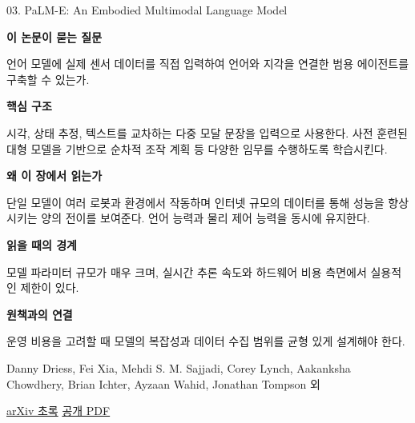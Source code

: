 \documentclass[11pt,openany]{book}
\begin{document}
\begin{termcard}{03. PaLM-E: An Embodied Multimodal Language Model}

\par

\medskip

{\sffamily\bfseries\color{deepblue} 이 논문이 묻는 질문}\par

언어 모델에 실제 센서 데이터를 직접 입력하여 언어와 지각을 연결한 범용 에이전트를 구축할 수 있는가.

\smallskip

{\sffamily\bfseries\color{deepblue} 핵심 구조}\par

시각, 상태 추정, 텍스트를 교차하는 다중 모달 문장을 입력으로 사용한다. 사전 훈련된 대형 모델을 기반으로 순차적 조작 계획 등 다양한 임무를 수행하도록 학습시킨다.

\smallskip

{\sffamily\bfseries\color{deepblue} 왜 이 장에서 읽는가}\par

단일 모델이 여러 로봇과 환경에서 작동하며 인터넷 규모의 데이터를 통해 성능을 향상시키는 양의 전이를 보여준다. 언어 능력과 물리 제어 능력을 동시에 유지한다.

\smallskip

{\sffamily\bfseries\color{coral} 읽을 때의 경계}\par

모델 파라미터 규모가 매우 크며, 실시간 추론 속도와 하드웨어 비용 측면에서 실용적인 제한이 있다.

\smallskip

{\sffamily\bfseries\color{teal} 원책과의 연결}\par

운영 비용을 고려할 때 모델의 복잡성과 데이터 수집 범위를 균형 있게 설계해야 한다.

\medskip

{\footnotesize\color{muted} Danny Driess, Fei Xia, Mehdi S. M. Sajjadi, Corey Lynch, Aakanksha Chowdhery, Brian Ichter, Ayzaan Wahid, Jonathan Tompson 외\par

\href{https://arxiv.org/abs/2303.03378}{arXiv 초록} \quad \href{https://arxiv.org/pdf/2303.03378}{공개 PDF}\par}

\end{termcard}
\end{document}
